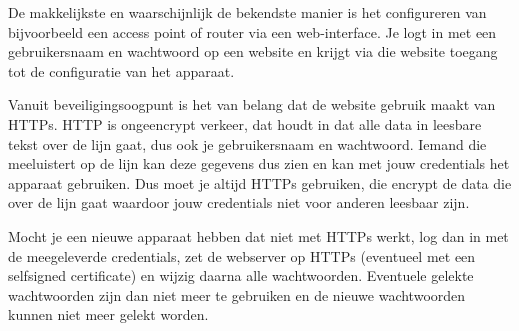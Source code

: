 De makkelijkste en waarschijnlijk de bekendste manier is het configureren van bijvoorbeeld een access point of router via een web-interface. Je logt in met een gebruikersnaam en wachtwoord op een website en krijgt via die website toegang tot de configuratie van het apparaat.

Vanuit beveiligingsoogpunt is het van belang dat de website gebruik maakt van HTTPs. HTTP is ongeencrypt verkeer, dat houdt in dat alle data in leesbare tekst over de lijn gaat, dus ook je gebruikersnaam en wachtwoord. Iemand die meeluistert op de lijn kan deze gegevens dus zien en kan met jouw credentials het apparaat gebruiken. Dus moet je altijd HTTPs gebruiken, die encrypt de data die over de lijn gaat waardoor jouw credentials niet voor anderen leesbaar zijn.

Mocht je een nieuwe apparaat hebben dat niet met HTTPs werkt, log dan in met de meegeleverde credentials, zet de webserver op HTTPs (eventueel met een selfsigned certificate) en wijzig daarna alle wachtwoorden. Eventuele gelekte wachtwoorden zijn dan niet meer te gebruiken en de nieuwe wachtwoorden kunnen niet meer gelekt worden.

